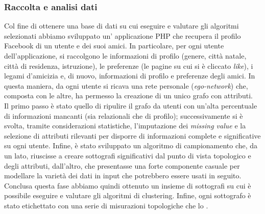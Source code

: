 \subsubsection{Raccolta e analisi dati}
Col fine di ottenere una base di dati su cui eseguire e valutare gli algoritmi selezionati abbiamo sviluppato un' applicazione PHP che recupera il profilo Facebook di un utente e dei suoi amici. In particolare, per ogni utente dell'applicazione, si raccolgono le informazioni di profilo (genere, citt\`a natale, citt\`a di residenza, istruzione), le preferenze (le pagine su cui si \`e cliccato \textit{like}), i legami d'amicizia e, di nuovo, informazioni di profilo e preferenze degli amici. In questa maniera, da ogni utente si ricava una rete personale (\textit{ego-network}) che, composta con le altre, ha permesso la creazione di un unico grafo con attributi.\\
Il primo passo \`e stato quello di ripulire il grafo da utenti con un'alta percentuale di informazioni mancanti (sia relazionali che di profilo); successivamente si \`e svolta, tramite considerazioni statistiche, l'imputazione dei \textit{missing value} e la selezione di attributi rilevanti per disporre di informazioni complete e significative su ogni utente. Infine, \`e stato sviluppato un algoritmo di campionamento che, da un lato, riuscisse a creare sottografi significativi dal punto di vista topologico e degli attributi, dall'altro, che presentasse una forte componente casuale per modellare la variet\`a dei dati in input che potrebbero essere usati in seguito. Conclusa questa fase abbiamo quindi ottenuto un insieme di sottografi su cui \`e possibile eseguire e valutare gli algoritmi di clustering. Infine, ogni sottografo \`e stato etichettato con una serie di misurazioni topologiche che lo .

